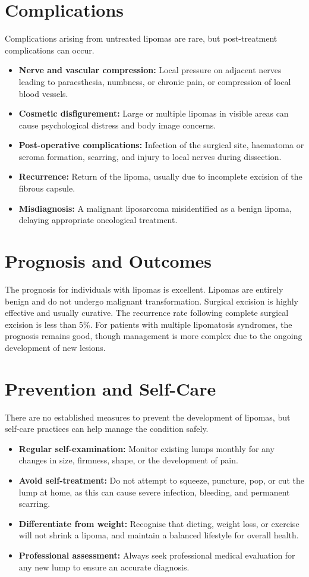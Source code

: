 \section*{Complications}
Complications arising from untreated lipomas are rare, but post-treatment complications can occur.

\begin{itemize}
    \item \textbf{Nerve and vascular compression:} Local pressure on adjacent nerves leading to paraesthesia, numbness, or chronic pain, or compression of local blood vessels.
    \item \textbf{Cosmetic disfigurement:} Large or multiple lipomas in visible areas can cause psychological distress and body image concerns.
    \item \textbf{Post-operative complications:} Infection of the surgical site, haematoma or seroma formation, scarring, and injury to local nerves during dissection.
    \item \textbf{Recurrence:} Return of the lipoma, usually due to incomplete excision of the fibrous capsule.
    \item \textbf{Misdiagnosis:} A malignant liposarcoma misidentified as a benign lipoma, delaying appropriate oncological treatment.
\end{itemize}

\section*{Prognosis and Outcomes}
The prognosis for individuals with lipomas is excellent. Lipomas are entirely benign and do not undergo malignant transformation. Surgical excision is highly effective and usually curative. The recurrence rate following complete surgical excision is less than 5\%. For patients with multiple lipomatosis syndromes, the prognosis remains good, though management is more complex due to the ongoing development of new lesions.

\section*{Prevention and Self-Care}
There are no established measures to prevent the development of lipomas, but self-care practices can help manage the condition safely.

\begin{itemize}
    \item \textbf{Regular self-examination:} Monitor existing lumps monthly for any changes in size, firmness, shape, or the development of pain.
    \item \textbf{Avoid self-treatment:} Do not attempt to squeeze, puncture, pop, or cut the lump at home, as this can cause severe infection, bleeding, and permanent scarring.
    \item \textbf{Differentiate from weight:} Recognise that dieting, weight loss, or exercise will not shrink a lipoma, and maintain a balanced lifestyle for overall health.
    \item \textbf{Professional assessment:} Always seek professional medical evaluation for any new lump to ensure an accurate diagnosis.
\end{itemize}

